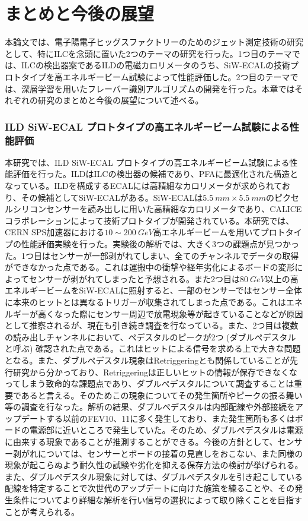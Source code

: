 
\chapter{まとめと今後の展望} \label{sec:Conclusion}
本論文では、電子陽電子ヒッグスファクトリーのためのジェット測定技術の研究として、特にILCを念頭に置いた2つのテーマの研究を行った。1つ目のテーマでは、ILCの検出器案であるILDの電磁カロリメータのうち、SiW-ECALの技術プロトタイプを高エネルギービーム試験によって性能評価した。2つ目のテーマでは、深層学習を用いたフレーバー識別アルゴリズムの開発を行った。本章ではそれぞれの研究のまとめと今後の展望について述べる。

\subsection*{ILD SiW-ECAL プロトタイプの高エネルギービーム試験による性能評価}
本研究では、ILD SiW-ECAL プロトタイプの高エネルギービーム試験による性能評価を行った。ILDはILCの検出器の候補であり、PFAに最適化された構造となっている。ILDを構成するECALには高精細なカロリメータが求められており、その候補としてSiW-ECALがある。SiW-ECALは$\SI{5.5}{mm} \times \SI{5.5}{mm}$のピクセルシリコンセンサーを読み出しに用いた高精細なカロリメータであり、CALICEコラボレーションによって技術プロトタイプが開発されている。本研究では、CERN SPS加速器における$10 \sim \SI{200}{GeV}$高エネルギービームを用いてプロトタイプの性能評価実験を行った。実験後の解析では、大きく3つの課題点が見つかった。1つ目はセンサーが一部剥がれてしまい、全てのチャンネルでデータの取得ができなかった点である。これは運搬中の衝撃や経年劣化によるボードの変形によってセンサーが剥がれてしまったと予想される。また2つ目は$\SI{80}{GeV}$以上の高エネルギービームをSiW-ECALに照射すると、一部のセンサーではセンサー全体に本来のヒットとは異なるトリガーが収集されてしまった点である。これはエネルギーが高くなった際にセンサー周辺で放電現象等が起きていることなどが原因として推察されるが、現在も引き続き調査を行なっている。また、2つ目は複数の読み出しチャンネルにおいて、ペデスタルのピークが2つ (ダブルぺデスタルと呼ぶ) 確認された点である。これはヒットによる信号を求める上で大きな問題となる。また、ダブルぺデスタル現象はRetriggeringとも関係していることが先行研究から分かっており、Retriggeringは正しいヒットの情報が保存できなくなってしまう致命的な課題点であり、ダブルぺデスタルについて調査することは重要であると言える。そのためこの現象についてその発生箇所やピークの振る舞い等の調査を行なった。解析の結果、ダブルぺデスタルは内部配線や外部接続をアップデートする以前のFEV10、11に多く発生しており、また発生箇所も多くはボードの電源部に近いところで発生していた。そのため、ダブルぺデスタルは電源に由来する現象であることが推測することができる。今後の方針として、センサー剥がれについては、センサーとボードの接着の見直しをおこない、また同様の現象が起こらぬよう耐久性の試験や劣化を抑える保存方法の検討が挙げられる。また、ダブルぺデスタル現象に対しては、ダブルぺデスタルを引き起こしている配線を特定することで次世代のアップデートに向けた施策を練ることや、その発生条件についてより詳細な解析を行い信号の選択によって取り除くことを目指すことが考えられる。

